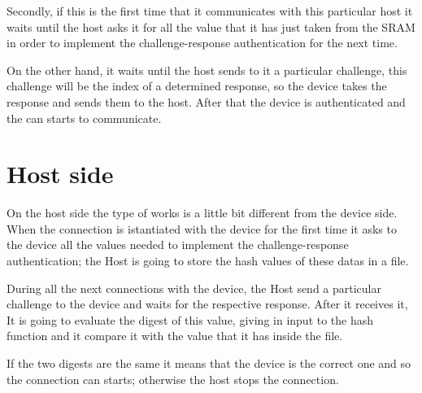 Secondly, if this is the first time that it communicates with this particular host it waits until the host asks it for all the value that it has just taken from the SRAM in order to implement the challenge-response authentication for the next time.

On the other hand, it waits until the host sends to it a particular challenge, this challenge will be the index of a determined response, so the device takes the response and sends them to the host.
After that the device is authenticated and the can starts to communicate.



\section {Host side} 
On the host side the type of works is a little bit different from the device side.
When the connection is istantiated with the device for the first time it asks to the device all the values needed to implement the challenge-response authentication; the Host is going to store the hash values of these datas in a file.

During all the next connections with the device, the Host send a particular challenge to the device and waits for the respective response.
After it receives it, It is going to evaluate the digest of this value, giving in input to the hash function and it compare it with the value that it has inside the file.

If the two digests are the same it means that the device is the correct one and so the connection can starts; otherwise the host stops the connection.


